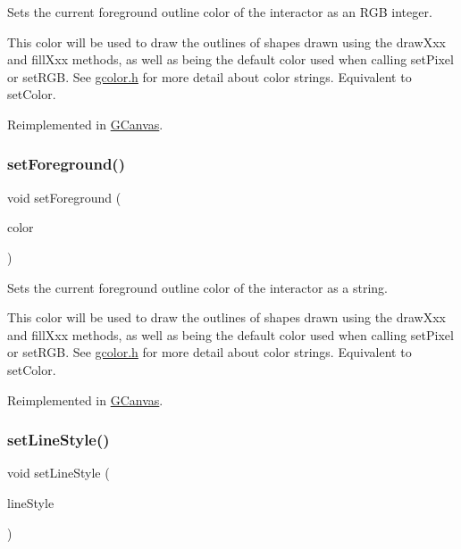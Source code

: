 Sets the current foreground outline color of the interactor as an R\+GB integer. 

This color will be used to draw the outlines of shapes drawn using the draw\+Xxx and fill\+Xxx methods, as well as being the default color used when calling set\+Pixel or set\+R\+GB. See \mbox{\hyperlink{gcolor_8h_source}{gcolor.\+h}} for more detail about color strings. Equivalent to set\+Color. 

Reimplemented in \mbox{\hyperlink{classGCanvas_a59f7cd2bd1708c12dfa52a8f7c7b79c9}{G\+Canvas}}.

\mbox{\label{classGDrawingSurface_af59209aeadea6dfc6d97a2d8531f50e1}} 
\subsubsection{\texorpdfstring{set\+Foreground()}{setForeground()}\hspace{0.1cm}{\footnotesize\ttfamily [2/2]}}
{\footnotesize\ttfamily void set\+Foreground (\begin{DoxyParamCaption}\item[{const std\+::string \&}]{color }\end{DoxyParamCaption})\hspace{0.3cm}{\ttfamily [virtual]}}



Sets the current foreground outline color of the interactor as a string. 

This color will be used to draw the outlines of shapes drawn using the draw\+Xxx and fill\+Xxx methods, as well as being the default color used when calling set\+Pixel or set\+R\+GB. See \mbox{\hyperlink{gcolor_8h_source}{gcolor.\+h}} for more detail about color strings. Equivalent to set\+Color. 

Reimplemented in \mbox{\hyperlink{classGCanvas_a8afbcf1f47750fb4c717f9ff36540235}{G\+Canvas}}.

\mbox{\label{classGDrawingSurface_a6bfe14a77101db0fb97b5a7e07a5526b}} 
\subsubsection{\texorpdfstring{set\+Line\+Style()}{setLineStyle()}}
{\footnotesize\ttfamily void set\+Line\+Style (\begin{DoxyParamCaption}\item[{\mbox{\hyperlink{classGObject_a86e0f5648542856159bb40775c854aa7}{G\+Object\+::\+Line\+Style}}}]{line\+Style }\end{DoxyParamCaption})\hspace{0.3cm}{\ttfamily [virtual]}}



